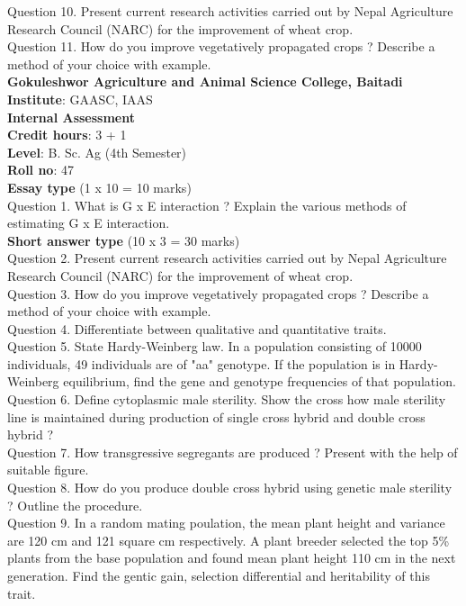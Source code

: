\documentclass[12pt]{article}\usepackage[]{graphicx}\usepackage[]{color}
\begin{document}
Question 10. Present current research activities carried out by Nepal Agriculture Research Council (NARC) for the improvement of wheat crop.\\
Question 11. How do you improve vegetatively propagated crops ? Describe a method of your choice with example.\\
\clearpage 
{\centering \Large{\textbf{Gokuleshwor Agriculture and Animal Science College, Baitadi}} \\[0.25cm]
            \textbf{Institute}: GAASC, IAAS \\[0.2cm]
            \textbf{Internal Assessment} \\[0.2cm]} 
\textbf{Credit hours}: 3 + 1 \\ 
\textbf{Level}: B. Sc. Ag (4th Semester) \\
\textbf{Roll no}: 47 \\[0.5cm] 
\textbf{Essay type} (1 x 10 = 10 marks) \\
Question 1. What is G x E interaction ? Explain the various methods of estimating G x E interaction.\\
\textbf{Short answer type} (10 x 3 = 30 marks) \\
Question 2. Present current research activities carried out by Nepal Agriculture Research Council (NARC) for the improvement of wheat crop.\\
Question 3. How do you improve vegetatively propagated crops ? Describe a method of your choice with example.\\
Question 4. Differentiate between qualitative and quantitative traits.\\
Question 5. State Hardy-Weinberg law. In a population consisting of 10000 individuals, 49 individuals are of "aa" genotype. If the population is in Hardy-Weinberg equilibrium, find the gene and genotype frequencies of that population.\\
Question 6. Define cytoplasmic male sterility. Show the cross how male sterility line is maintained during production of single cross hybrid and double cross hybrid ?\\
Question 7. How transgressive segregants are produced ? Present with the help of suitable figure.\\
Question 8. How do you produce double cross hybrid using genetic male sterility ? Outline the procedure.\\
Question 9. In a random mating poulation, the mean plant height and variance are 120 cm and 121 square cm respectively. A plant breeder selected the top 5\% plants from the base population and found mean plant height 110 cm in the next generation. Find the gentic gain, selection differential and heritability of this trait.\\
\end{document}
